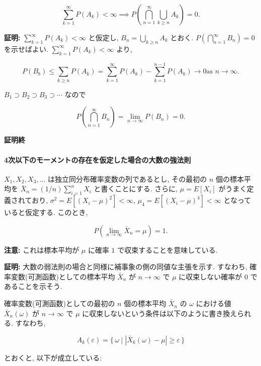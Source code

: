 \documentclass[10pt, a4paper,xelatex,ja=standard]{bxjsarticle}
\newcommand\eps{\varepsilon}
\begin{document}
\[
\sum_{k=1}^\infty P(A_k) < \infty \implies
P\left(\bigcap_{n=1}^\infty \bigcup_{k\ge n} A_k\right) = 0.
\]

\textbf{証明:} \(\sum_{k=1}^\infty P(A_k) < \infty\) と仮定し,
\(B_n = \bigcup_{k\ge n} A_k\) とおく.
\(P\left(\bigcap_{n=1}^\infty B_n\right) = 0\) を示せばよい.
\(\sum_{k=1}^\infty P(A_k) < \infty\) より,

\[
P(B_b) \le \sum_{k\ge n} P(A_k) =
\sum_{k=1}^\infty P(A_k) - \sum_{k=1}^{n-1} P(A_k) \to 0
\text{as $n\to\infty$}.
\]

\(B_1\supset B_2\supset B_3\supset\cdots\) なので

\[
P\left(\bigcap_{n=1}^\infty B_n\right) = \lim_{n\to\infty} P(B_n) = 0.
\]

\textbf{証明終}

    \hypertarget{ux6b21ux4ee5ux4e0bux306eux30e2ux30fcux30e1ux30f3ux30c8ux306eux5b58ux5728ux3092ux4eeeux5b9aux3057ux305fux5834ux5408ux306eux5927ux6570ux306eux5f37ux6cd5ux5247}{%
\paragraph{4次以下のモーメントの存在を仮定した場合の大数の強法則}\label{ux6b21ux4ee5ux4e0bux306eux30e2ux30fcux30e1ux30f3ux30c8ux306eux5b58ux5728ux3092ux4eeeux5b9aux3057ux305fux5834ux5408ux306eux5927ux6570ux306eux5f37ux6cd5ux5247}}

\(X_1,X_2,X_3,\ldots\) は独立同分布確率変数の列であるとし, その最初の
\(n\) 個の標本平均を \(\bar{X}_n = (1/n)\sum_{i=1}^n X_i\)
と書くことにする. さらに, \(\mu=E[X_i]\) がうまく定義されており,
\(\sigma^2=E[(X_i-\mu)^2]<\infty\), \(\mu_4 = E[(X_i-\mu)^4]<\infty\)
となっていると仮定する. このとき,

\[
P\left(\lim_{n\to\infty}\bar{X}_n = \mu\right) = 1.
\]

\textbf{注意:} これは標本平均が \(\mu\) に確率 \(1\)
で収束することを意味している.

\textbf{証明:} 大数の弱法則の場合と同様に補事象の側の同値な主張を示す.
すなわち, 確率変数(可測函数)としての標本平均 \(\bar{X}_n\) が
\(n\to\infty\) で \(\mu\) に収束しない確率が \(0\) であることを示そう.

確率変数(可測函数)としての最初の \(n\) 個の標本平均 \(\bar{X}_n\) の
\(\omega\) における値 \(\bar{X}_n(\omega)\) が \(n\to\infty\) で \(\mu\)
に収束しないという条件は以下のように書き換えられる. すなわち,

\[
A_k(\eps) = \{\,\omega\mid |\bar{X}_k(\omega)-\mu|\ge\eps\,\}
\]

とおくと, 以下が成立している:
\end{document}
